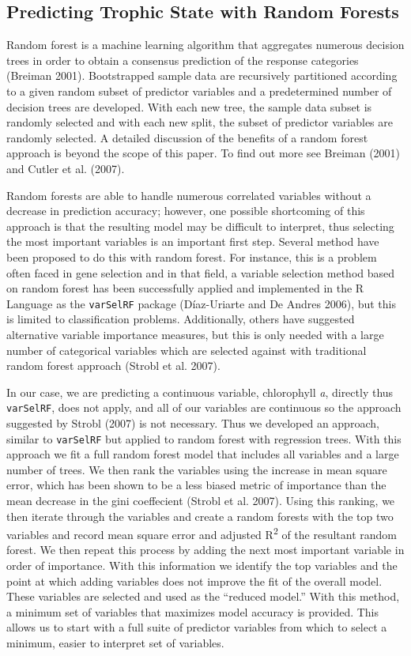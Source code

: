 \documentclass[11pt,]{article}
\begin{document}
\subsection{Predicting Trophic State with Random
Forests}\label{predicting-trophic-state-with-random-forests}

Random forest is a machine learning algorithm that aggregates numerous
decision trees in order to obtain a consensus prediction of the response
categories (Breiman 2001). Bootstrapped sample data are recursively
partitioned according to a given random subset of predictor variables
and a predetermined number of decision trees are developed. With each
new tree, the sample data subset is randomly selected and with each new
split, the subset of predictor variables are randomly selected. A
detailed discussion of the benefits of a random forest approach is
beyond the scope of this paper. To find out more see Breiman (2001) and
Cutler et al. (2007).

Random forests are able to handle numerous correlated variables without
a decrease in prediction accuracy; however, one possible shortcoming of
this approach is that the resulting model may be difficult to interpret,
thus selecting the most important variables is an important first step.
Several method have been proposed to do this with random forest. For
instance, this is a problem often faced in gene selection and in that
field, a variable selection method based on random forest has been
successfully applied and implemented in the R Language as the
\texttt{varSelRF} package (D{í}az-Uriarte and De Andres 2006), but this
is limited to classification problems. Additionally, others have
suggested alternative variable importance measures, but this is only
needed with a large number of categorical variables which are selected
against with traditional random forest approach (Strobl et al. 2007).

In our case, we are predicting a continuous variable, chlorophyll
\emph{a}, directly thus \texttt{varSelRF}, does not apply, and all of
our variables are continuous so the approach suggested by Strobl (2007)
is not necessary. Thus we developed an approach, similar to
\texttt{varSelRF} but applied to random forest with regression trees.
With this approach we fit a full random forest model that includes all
variables and a large number of trees. We then rank the variables using
the increase in mean square error, which has been shown to be a less
biased metric of importance than the mean decrease in the gini
coeffecient (Strobl et al. 2007). Using this ranking, we then iterate
through the variables and create a random forests with the top two
variables and record mean square error and adjusted R\textsuperscript{2}
of the resultant random forest. We then repeat this process by adding
the next most important variable in order of importance. With this
information we identify the top variables and the point at which adding
variables does not improve the fit of the overall model. These variables
are selected and used as the ``reduced model.'' With this method, a
minimum set of variables that maximizes model accuracy is provided. This
allows us to start with a full suite of predictor variables from which
to select a minimum, easier to interpret set of variables.
\end{document}
